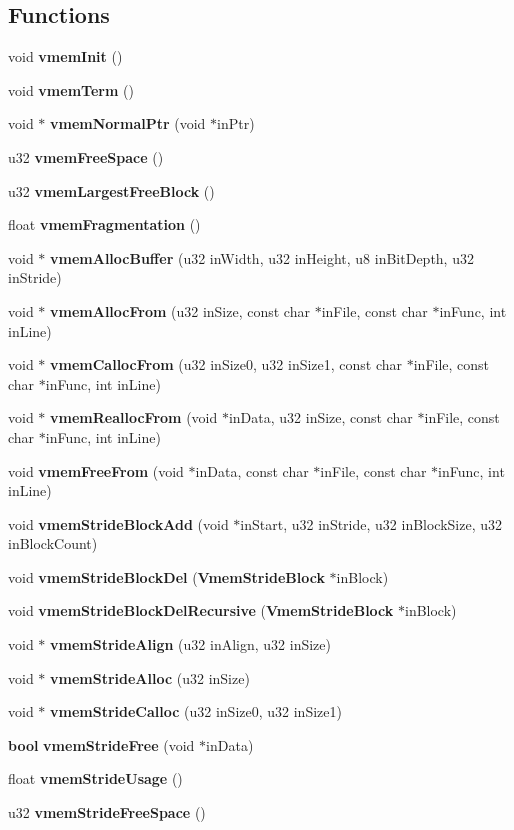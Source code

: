 \subsection*{Functions}
\begin{CompactItemize}
\item 
void {\bf vmem\-Init} ()
\item 
void {\bf vmem\-Term} ()
\item 
void $\ast$ {\bf vmem\-Normal\-Ptr} (void $\ast$in\-Ptr)
\item 
u32 {\bf vmem\-Free\-Space} ()
\item 
u32 {\bf vmem\-Largest\-Free\-Block} ()
\item 
float {\bf vmem\-Fragmentation} ()
\item 
void $\ast$ {\bf vmem\-Alloc\-Buffer} (u32 in\-Width, u32 in\-Height, u8 in\-Bit\-Depth, u32 in\-Stride)
\item 
void $\ast$ {\bf vmem\-Alloc\-From} (u32 in\-Size, const char $\ast$in\-File, const char $\ast$in\-Func, int in\-Line)
\item 
void $\ast$ {\bf vmem\-Calloc\-From} (u32 in\-Size0, u32 in\-Size1, const char $\ast$in\-File, const char $\ast$in\-Func, int in\-Line)
\item 
void $\ast$ {\bf vmem\-Realloc\-From} (void $\ast$in\-Data, u32 in\-Size, const char $\ast$in\-File, const char $\ast$in\-Func, int in\-Line)
\item 
void {\bf vmem\-Free\-From} (void $\ast$in\-Data, const char $\ast$in\-File, const char $\ast$in\-Func, int in\-Line)
\item 
void {\bf vmem\-Stride\-Block\-Add} (void $\ast$in\-Start, u32 in\-Stride, u32 in\-Block\-Size, u32 in\-Block\-Count)
\item 
void {\bf vmem\-Stride\-Block\-Del} ({\bf Vmem\-Stride\-Block} $\ast$in\-Block)
\item 
void {\bf vmem\-Stride\-Block\-Del\-Recursive} ({\bf Vmem\-Stride\-Block} $\ast$in\-Block)
\item 
void $\ast$ {\bf vmem\-Stride\-Align} (u32 in\-Align, u32 in\-Size)
\item 
void $\ast$ {\bf vmem\-Stride\-Alloc} (u32 in\-Size)
\item 
void $\ast$ {\bf vmem\-Stride\-Calloc} (u32 in\-Size0, u32 in\-Size1)
\item 
{\bf bool} {\bf vmem\-Stride\-Free} (void $\ast$in\-Data)
\item 
float {\bf vmem\-Stride\-Usage} ()
\item 
u32 {\bf vmem\-Stride\-Free\-Space} ()
\end{CompactItemize}
